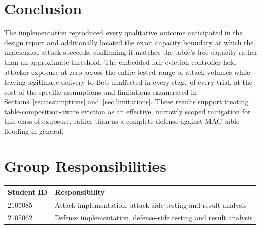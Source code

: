\documentclass[10pt,a4paper]{article}
\begin{document}
\section{Conclusion}
The implementation reproduced every qualitative outcome anticipated in the design report and additionally located the exact capacity boundary at which the undefended attack succeeds, confirming it matches the table's free capacity rather than an approximate threshold. The embedded fair-eviction controller held attacker exposure at zero across the entire tested range of attack volumes while leaving legitimate delivery to Bob unaffected in every stage of every trial, at the cost of the specific assumptions and limitations enumerated in Sections~\ref{sec:assumptions} and~\ref{sec:limitations}. These results support treating table-composition-aware eviction as an effective, narrowly scoped mitigation for this class of exposure, rather than as a complete defense against MAC table flooding in general.

\section{Group Responsibilities}
\begin{center}
\begin{tabular}{@{}ll@{}}
\toprule Student ID & Responsibility\\\midrule
2105085 & Attack implementation, attack-side testing and result analysis\\
2105062 & Defense implementation, defense-side testing and result analysis\\\bottomrule
\end{tabular}
\end{center}
\end{document}
